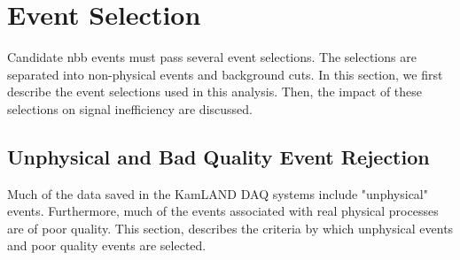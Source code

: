 \section{Event Selection}
Candidate \0nbb events must pass several event selections. The selections are separated into non-physical events and background cuts. In this section, we first describe the event selections used in this analysis. Then, the impact of these selections on signal inefficiency are discussed.

\subsection{Unphysical and Bad Quality Event Rejection}
Much of the data saved in the KamLAND DAQ systems include "unphysical" events. Furthermore, much of the events associated with real physical processes are of poor quality. This section, describes the criteria by which unphysical events and poor quality events are selected.
